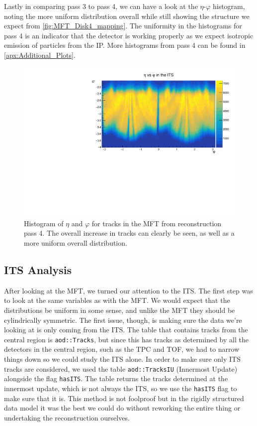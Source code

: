 \bigskip

Lastly in comparing pass 3 to pass 4, we can have a look at the $\eta$-$\varphi$ histogram, noting the more uniform distribution overall while still showing the structure we expect from \cref{fig:MFT_Disk4_mapping}. The uniformity in the histograms for pass 4 is an indicator that the detector is working properly as we expect isotropic emission of particles from the IP. More histograms from pass 4 can be found in \cref{apx:Additional_Plots}.

\begin{figure}[h]
    \begin{center}
        \includegraphics[width=.8\textwidth]{Plots/pass4_MFT/eta_phi_pass4.pdf}
        \caption[$\eta$-$\varphi$ histogram for tracks from pass 4 in the MFT]{Histogram of $\eta$ and $\varphi$ for tracks in the MFT from reconstruction pass 4. The overall increase in tracks can clearly be seen, as well as a more uniform overall distribution.}
        \label{fig:eta_phi_pass4}
    \end{center}
\end{figure}

\subsection{ITS Analysis}
After looking at the MFT, we turned our attention to the ITS. The first step was to look at the same variables as with the MFT. We would expect that the distributions be uniform in some sense, and unlike the MFT they should be cylindrically symmetric. The first issue, though, is making sure the data we're looking at is only coming from the ITS. The table that contains tracks from the central region is \texttt{aod::Tracks}, but since this has tracks as determined by all the detectors in the central region, such as the TPC and TOF, we had to narrow things down so we could study the ITS alone. In order to make sure only ITS tracks are considered, we used the table \texttt{aod::TracksIU} (Innermost Update) alongside the flag \texttt{hasITS}. The table returns the tracks determined at the innermost update, which is not always the ITS, so we use the \texttt{hasITS} flag to make sure that it is. This method is not foolproof but in the rigidly structured data model it was the best we could do without reworking the entire thing or undertaking the reconstruction ourselves.

